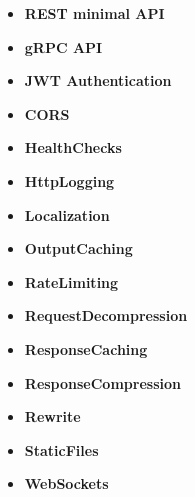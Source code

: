 \begin{itemize}
    \item \textbf{REST minimal API}
    \item \textbf{gRPC API}
    \item \textbf{JWT Authentication}
    \item \textbf{CORS}
    \item \textbf{HealthChecks}
    \item \textbf{HttpLogging}
    \item \textbf{Localization}
    \item \textbf{OutputCaching}
    \item \textbf{RateLimiting}
    \item \textbf{RequestDecompression}
    \item \textbf{ResponseCaching}
    \item \textbf{ResponseCompression}
    \item \textbf{Rewrite}
    \item \textbf{StaticFiles}
    \item \textbf{WebSockets}
\end{itemize}
